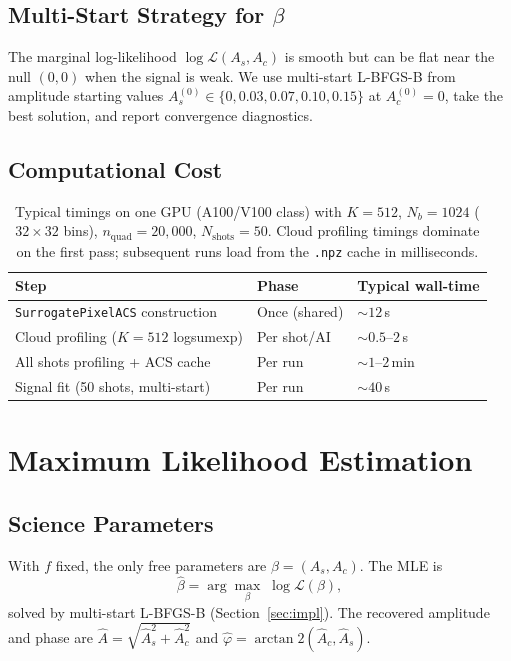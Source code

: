 \documentclass[11pt,a4paper]{article}
\newcommand{\Lcal}{\mathcal{L}}
\begin{document}
\subsection{Multi-Start Strategy for $\beta$}

The marginal log-likelihood $\log\Lcal(A_s, A_c)$ is smooth but can be flat
near the null $(0,0)$ when the signal is weak.  We use multi-start L-BFGS-B
from amplitude starting values $A_s^{(0)} \in \{0, 0.03, 0.07, 0.10, 0.15\}$
at $A_c^{(0)} = 0$, take the best solution, and report convergence diagnostics.

\subsection{Computational Cost}

\begin{table}[h]
\centering
\begin{tabular}{lll}
\toprule
Step & Phase & Typical wall-time \\
\midrule
\texttt{SurrogatePixelACS} construction   & Once (shared) & $\sim\!12$\,s \\
Cloud profiling ($K{=}512$ logsumexp)     & Per shot/AI   & $\sim\!0.5$--$2$\,s \\
All shots profiling + ACS cache           & Per run       & $\sim\!1$--$2$\,min \\
Signal fit (50 shots, multi-start)        & Per run       & $\sim\!40$\,s \\
\bottomrule
\end{tabular}
\caption{Typical timings on one GPU (A100/V100 class) with $K=512$, $N_b=1024$
($32\times32$ bins), $n_\mathrm{quad}=20{,}000$, $N_\mathrm{shots}=50$.
Cloud profiling timings dominate on the first pass; subsequent runs load from
the \texttt{.npz} cache in milliseconds.}
\label{tab:cost}
\end{table}

\section{Maximum Likelihood Estimation}

\subsection{Science Parameters}

With $f$ fixed, the only free parameters are $\beta = (A_s, A_c)$.
The MLE is
\begin{equation}
  \hat\beta = \arg\max_\beta\; \log\Lcal(\beta),
  \label{eq:mle}
\end{equation}
solved by multi-start L-BFGS-B (Section~\ref{sec:impl}).  The recovered
amplitude and phase are $\hat A = \sqrt{\hat A_s^2 + \hat A_c^2}$ and
$\hat\varphi = \arctan2(\hat A_c, \hat A_s)$.
\end{document}
